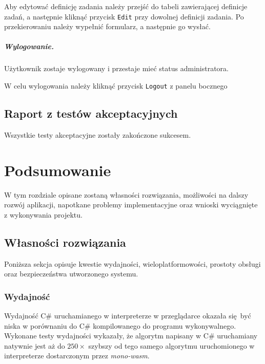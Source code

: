 \documentclass[a4paper,11pt,twoside]{report}
\theoremstyle{definition}
\begin{document}
                Aby edytować definicję zadania należy przejść do tabeli zawierającej definicje zadań, a następnie kliknąć przycisk \texttt{Edit} przy dowolnej definicji zadania. Po przekierowaniu należy wypełnić formularz, a następnie go wysłać.

            \paragraph{Wylogowanie.}
                \noindent Użytkownik zostaje wylogowany i przestaje mieć status administratora.

                W celu wylogowania należy kliknąć przycisk \texttt{Logout} z panelu bocznego


            \subsubsection{}    
            
    \section{Raport z testów akceptacyjnych}
    
        Wszystkie testy akceptacyjne zostały zakończone sukcesem.

\chapter{Podsumowanie}

    W tym rozdziale opisane zostaną własności rozwiązania, możliwości na dalszy rozwój aplikacji,
    napotkane problemy implementacyjne oraz wnioski wyciągnięte z wykonywania projektu.

    \section{Własności rozwiązania}
        \label{wlasnosci-rozwiazania}
        Poniższa sekcja opisuje kwestie wydajności, wieloplatformowości, prostoty obsługi oraz bezpieczeństwa utworzonego systemu.
        
        \subsection{Wydajność}
            Wydajność C\# uruchamianego w interpreterze w przeglądarce okazała się być niska w porównaniu do C\# kompilowanego do programu wykonywalnego.
            Wykonane testy wydajności wykazały, że algorytm napisany w C\# uruchamiany natywnie jest aż do $250\times$ szybszy od tego samego algorytmu uruchomionego w interpreterze dostarczonym przez \textit{mono-wasm}.
            
\end{document}
